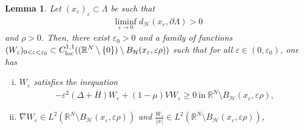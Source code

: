 \documentclass[a4paper]{amsart}
\newtheorem{lemma}[proposition]{Lemma}
\begin{document}
\begin{lemma}\label{lemma:barrier}
Let $(x_{\varepsilon})_{\varepsilon} \subset \Lambda$ be such that 
 \begin{align*}
 \liminf_{\varepsilon \to 0} d_{\mathcal{H}}(x_{\varepsilon}, \partial \Lambda) > 0
 \end{align*}
and $\rho > 0$.
Then, there exist $\varepsilon_0 > 0$ and a family of functions $(W_{\varepsilon})_{0<\varepsilon<\varepsilon_0} \subset
C^{1,1}_{\textnormal{loc}}(({\mathbb{R}}^N \setminus \{0\}) \setminus B_\mathcal{H}(x_{\varepsilon},\varepsilon \rho))$ such that for
all $\varepsilon \in (0,\varepsilon_0)$, one has
 \begin{enumerate}[(i)]
 \item $W_{\varepsilon}$ satisfies the inequation 
\begin{align*}
 -\varepsilon^2 \left( \Delta + H\right)  W_{\varepsilon} + (1-\mu) V W_{\varepsilon} \geq 0 \ \text{in}\ {\mathbb{R}}^N \setminus
B_\mathcal{H}(x_{\varepsilon},\varepsilon \rho),
\end{align*}
 \item\label{barrierb} $\nabla W_{\varepsilon} \in L^2({\mathbb{R}}^N\setminus B_\mathcal{H}(x_{\varepsilon},\varepsilon \rho))$ and
$\frac{W_{\varepsilon}}{{\left| {x} \right|}} \in L^2({\mathbb{R}}^N\setminus B_\mathcal{H}(x_{\varepsilon},\varepsilon \rho))$,
 

\end{enumerate}
\end{lemma}
\end{document}
